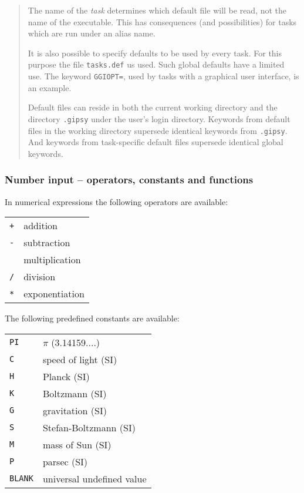 \begin{quote}
The name of the {\em task} determines which default file will be read, not the
name of the executable. This has consequences (and possibilities) for tasks
which are run under an alias name.

It is also possible to specify defaults to be used by every task. For this
purpose the file {\tt tasks.def} us used. Such global defaults have
a limited use. The keyword {\tt GGIOPT=}, used by tasks with a graphical user
interface, is an example.

Default files can reside in both the current working directory and the
directory {\tt .gipsy} under the user's
login directory. Keywords from default files in the working directory supersede
identical keywords from {\tt .gipsy}. And keywords from task-specific
default files supersede identical global keywords.

\end{quote}

\clearpage
\subsubsection*{Number input -- operators, constants and functions}
In numerical expressions the following operators are available:

{\small
\begin{tabular}{ll}
{\tt +}&addition \\
{\tt -}&subtraction \\
{\tt *}&multiplication \\
{\tt /}&division \\
{\tt **}&exponentiation \\
\end{tabular}
}

The following predefined constants are available:

{\small
\begin{tabular}{ll}
{\tt PI}&$\pi$ (3.14159....) \\
{\tt C}&speed of light (SI) \\
{\tt H}&Planck (SI) \\
{\tt K}&Boltzmann (SI) \\
{\tt G}&gravitation (SI) \\
{\tt S}&Stefan-Boltzmann (SI) \\
{\tt M}&mass of Sun (SI) \\
{\tt P}&parsec (SI) \\
{\tt BLANK}&universal undefined value \\
\end{tabular}
}

